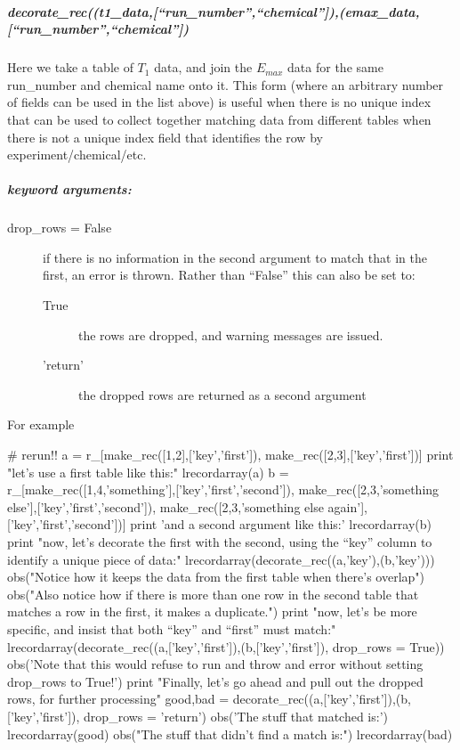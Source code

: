 \subparagraph{decorate\_rec((t1\_data,[``run\_number'',``chemical'']),(emax\_data,[``run\_number'',``chemical''])}
Here we take a table of $T_1$ data, and join the $E_{max}$ data for the same run\_number
    and chemical name onto it.
This form (where an arbitrary number of fields can be used in the list above)
    is useful when there is no unique index that can be used to
    collect together matching data from different tables
    when there is not a unique index field that identifies
    the row by experiment/chemical/etc.
\subparagraph{keyword arguments:}
\begin{description}
    \item[drop\_rows = False] if there is no information in the second argument to match that in the first, an error is thrown.  Rather than ``False'' this can also be set to:
        \begin{description}
            \item[True] the rows are dropped, and warning messages are issued.
            \item['return'] the dropped rows are returned as a second argument
        \end{description}
\end{description}

For example
\begin{python}
# rerun!!
a = r_[make_rec([1,2],['key','first']),
    make_rec([2,3],['key','first'])]
print "let's use a first table like this:"
lrecordarray(a)
b = r_[make_rec([1,4,'something'],['key','first','second']),
    make_rec([2,3,'something else'],['key','first','second']),
    make_rec([2,3,'something else again'],['key','first','second'])]
print 'and a second argument like this:'
lrecordarray(b)
print "now, let's decorate the first with the second, using the ``key'' column to identify a unique piece of data:"
lrecordarray(decorate_rec((a,'key'),(b,'key')))
obs("Notice how it keeps the data from the first table when there's overlap\n\n")
obs("Also notice how if there is more than one row in the second table that matches a row in the first, it makes a duplicate.")
print "now, let's be more specific, and insist that both ``key'' and ``first'' must match:"
lrecordarray(decorate_rec((a,['key','first']),(b,['key','first']),
    drop_rows = True))
obs('Note that this would refuse to run and throw and error without setting drop\_rows to True!')
print "Finally, let's go ahead and pull out the dropped rows, for further processing" 
good,bad = decorate_rec((a,['key','first']),(b,['key','first']),
    drop_rows = 'return')
obs('The stuff that matched is:')
lrecordarray(good)
obs("The stuff that didn't find a match is:")
lrecordarray(bad)
\end{python}
